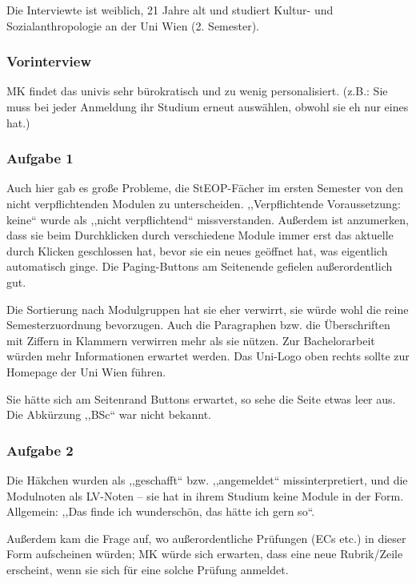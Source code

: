 \documentclass[a4paper,10pt]{scrartcl}
\begin{document}
Die Interviewte ist weiblich, 21 Jahre alt und studiert Kultur- und Sozialanthropologie an der Uni Wien (2. Semester).

\subsubsection*{Vorinterview}

MK findet das univis sehr bürokratisch und zu wenig personalisiert. (z.B.: Sie muss bei jeder Anmeldung ihr Studium erneut auswählen, obwohl sie eh nur eines hat.)

\subsubsection*{Aufgabe 1}

Auch hier gab es große Probleme, die StEOP-Fächer im ersten Semester von den nicht verpflichtenden Modulen zu unterscheiden. ,,Verpflichtende Voraussetzung: keine`` wurde als ,,nicht verpflichtend`` missverstanden. Außerdem ist anzumerken, dass sie beim Durchklicken durch verschiedene Module immer erst das aktuelle durch Klicken geschlossen hat, bevor sie ein neues geöffnet hat, was eigentlich automatisch ginge. Die Paging-Buttons am Seitenende gefielen außerordentlich gut.

Die Sortierung nach Modulgruppen hat sie eher verwirrt, sie würde wohl die reine Semesterzuordnung bevorzugen. Auch die Paragraphen bzw. die Überschriften mit Ziffern in Klammern verwirren mehr als sie nützen. Zur Bachelorarbeit würden mehr Informationen erwartet werden. Das Uni-Logo oben rechts sollte zur Homepage der Uni Wien führen.

Sie hätte sich am Seitenrand Buttons erwartet, so sehe die Seite etwas leer aus. Die Abkürzung ,,BSc`` war nicht bekannt.

\subsubsection*{Aufgabe 2}

Die Häkchen wurden als ,,geschafft`` bzw. ,,angemeldet`` missinterpretiert, und die Modulnoten als LV-Noten -- sie hat in ihrem Studium keine Module in der Form. Allgemein: ,,Das finde ich wunderschön, das hätte ich gern so``.

Außerdem kam die Frage auf, wo außerordentliche Prüfungen (ECs etc.) in dieser Form aufscheinen würden; MK würde sich erwarten, dass eine neue Rubrik/Zeile erscheint, wenn sie sich für eine solche Prüfung anmeldet.
\end{document}
